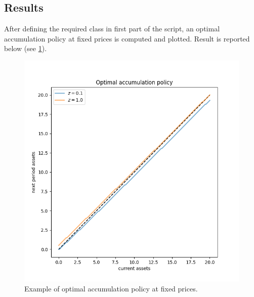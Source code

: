 \documentclass[12pt]{article}
\begin{document}
\subsection{Results}
After defining the required class in first part of the script, an optimal accumulation policy at fixed prices is computed and plotted. Result is reported below (see \ref{plot:policy}).  \\ 
\begin{figure}[]
\centering
\caption{Example of optimal accumulation policy at fixed prices.}
\label{plot:policy}
\includegraphics[scale = 0.8]{accumulation_policy.png}
\end{figure}
\end{document}
